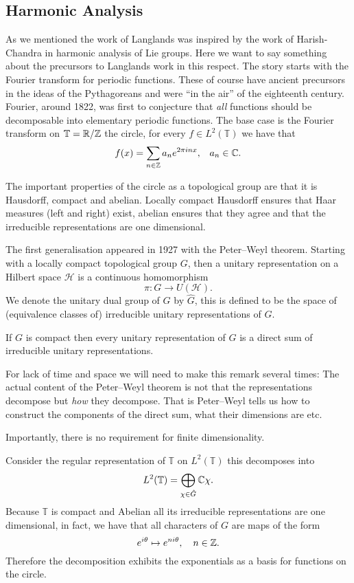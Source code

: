 \subsection{Harmonic Analysis}
As we mentioned the work of Langlands was inspired by the work of Harish-Chandra in harmonic analysis of Lie groups. Here we want to say something about the precursors to Langlands work in this respect.
The story starts with the Fourier transform for periodic functions. These of course have ancient precursors in the ideas of the Pythagoreans and were ``in the air'' of the eighteenth century. Fourier, around 1822, was first to conjecture that \textit{all} functions should be decomposable into elementary periodic functions. 
The base case is the Fourier transform on \(\mathbb{T} = \R/\Z  \) the circle, for every \(f\in L^2(\mathbb{T})\) we have that 
\[f(x) = \sum_{n\in \Z}a_ne^{2\pi i n x}, \;\;\; a_n\in \C.\]

The important properties of the circle as a topological group are that it is Hausdorff, compact and abelian. Locally compact Hausdorff ensures that Haar measures (left and right) exist, abelian ensures that they agree and that the irreducible representations are one dimensional. 

The first generalisation appeared in 1927 with the Peter--Weyl theorem. Starting with a locally compact topological group \(G\), then a unitary representation on a Hilbert space \(\mathcal{H}\) is a continuous homomorphism 
\[\pi: G \to U(\mathcal{H}).\]
We denote the unitary dual group of \(G\) by \(\hat{G}\), this is defined to be the space of (equivalence classes of) irreducible unitary representations of \(G\). 

\begin{Theorem}
	If \(G\) is compact then every unitary representation of \(G\) is a direct sum of irreducible unitary representations. 
\end{Theorem} 
\begin{remark}
	For lack of time and space we will need to make this remark several times: The actual content of the Peter--Weyl theorem is not that the representations decompose but \textit{how} they decompose. That is Peter--Weyl tells us how to construct the components of the direct sum, what their dimensions are etc.
\end{remark}
Importantly, there is no requirement for finite dimensionality. 

\begin{example}
	Consider the regular representation of \(\mathbb{T}\) on \(L^2(\mathbb{T})\) this decomposes into 
	\[L^2(\mathbb{T}) = \bigoplus_{\chi\in \hat{G}}  \C \chi .\]
	Because \(\mathbb{T}\) is compact and Abelian all its irreducible representations are one dimensional, in fact, we have that all characters of \(G\) are maps of the form  
	\[e^{i\theta} \mapsto e^{ni\theta}, \quad n\in \Z.\]
	Therefore the decomposition exhibits the exponentials as a basis for functions on the circle.
\end{example}

